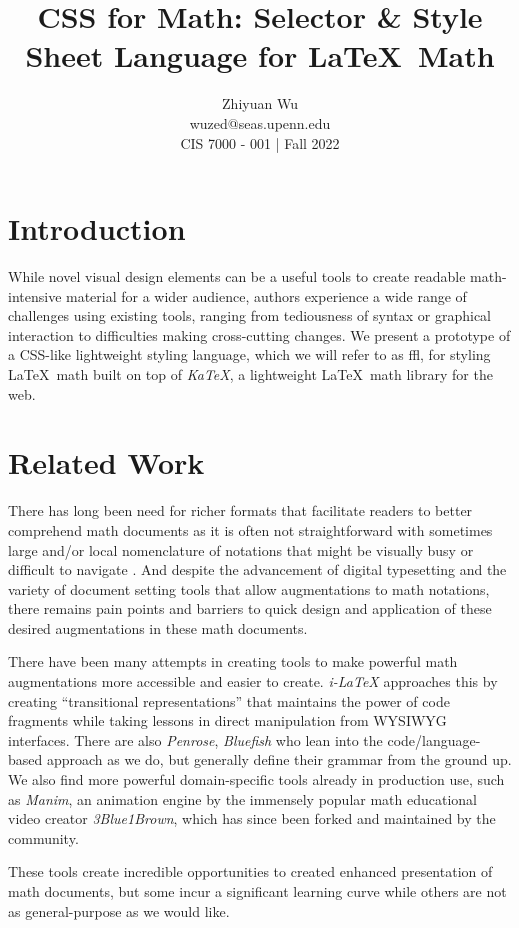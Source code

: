 \documentclass{article}
\title{\vspace{-2em}CSS for Math: Selector \& Style Sheet Language for \LaTeX\ Math\\[1ex]\normalsize}
\author{Zhiyuan Wu\\\small wuzed@seas.upenn.edu\vspace{1ex}\\\small CIS 7000 - 001 | Fall 2022}
\begin{document}
\maketitle
\begin{multicols*}{2}
  \section*{Introduction}
  While novel visual design elements can be a useful tools to create readable
  math-intensive material for a wider audience, authors experience a wide range
  of challenges using existing tools, ranging from tediousness of syntax or
  graphical interaction to difficulties making cross-cutting changes\cite{MAug}.
  We present a prototype of a CSS\cite{CSS}-like lightweight styling language,
  which we will refer to as \acrfull{ffl}, for
  styling \LaTeX\ math built on top of \textit{KaTeX}\cite{KaTeX}, a lightweight
  \LaTeX\ math library for the web.
  \section*{Related Work}
  There has long been need for richer formats that facilitate readers to better
  comprehend math documents as it is often not straightforward with sometimes large
  and/or local nomenclature of notations that might be visually busy or difficult to
  navigate \cite{MathComm}. And despite the advancement of digital
  typesetting and the variety of document setting tools that allow augmentations to math notations,
  there remains pain points and barriers to quick design and application of
  these desired augmentations \cite{MAug} in these math documents.
  \par
  There have been many attempts in creating tools to make powerful math augmentations
  more accessible and easier to create. \textit{i-LaTeX}\cite{iLaTeX} approaches this by
  creating ``transitional representations'' that maintains the power of code fragments
  while taking lessons in direct manipulation from WYSIWYG interfaces. There are also
  \textit{Penrose}\cite{Penrose}, \textit{Bluefish}\cite{Bluefish} who lean into the
  code/language-based approach as we do, but generally define their grammar from the ground up.
  We also find more powerful domain-specific tools already in production use, such as
  \textit{Manim}\cite{manim}, an animation engine by the immensely popular math educational video creator
  \textit{3Blue1Brown}, which has since been forked and maintained by the community.
  \par
  These tools create incredible opportunities to created enhanced presentation of
  math documents, but some incur a significant learning curve while others are not
  as general-purpose as we would like.

\end{multicols*}
\end{document}
